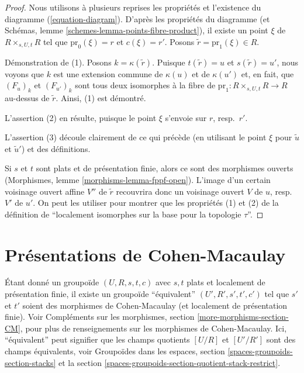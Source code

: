 \begin{proof}
Nous utilisons à plusieurs reprises les propriétés et l'existence du
diagramme (\ref{equation-diagram}).
D'après les propriétés du diagramme (et
Schémas, lemme \ref{schemes-lemma-points-fibre-product}),
il existe un point $\xi$ de $R \times_{s, U, t} R$
tel que $\text{pr}_0(\xi) = r$ et $c(\xi) = r'$.
Posons $\tilde r = \text{pr}_1(\xi) \in R$.

\medskip\noindent
Démonstration de (1). Posons $k = \kappa(\tilde r)$. Puisque $t(\tilde r) = u$
et $s(\tilde r) = u'$, nous voyons que $k$ est une extension commune
de $\kappa(u)$ et de $\kappa(u')$ et, en fait, que
$(F_u)_k$ et $(F_{u'})_k$ sont tous deux isomorphes à la fibre de
$\text{pr}_1 : R \times_{s, U, t} R \to R$ au-dessus de $\tilde r$.
Ainsi, (1) est démontré.

\medskip\noindent
L'assertion (2) en résulte, puisque le point $\xi$ s'envoie sur $r$, resp.\ $r'$.

\medskip\noindent
L'assertion (3) découle clairement de ce qui précède (en utilisant le point $\xi$ pour
$\tilde u$ et $\tilde u'$) et des définitions.

\medskip\noindent
Si $s$ et $t$ sont plats et de présentation finie, alors
ce sont des morphismes ouverts (Morphismes, lemme \ref{morphisms-lemma-fppf-open}).
L'image d'un certain voisinage ouvert affine $V''$ de $\tilde r$ recouvrira donc
un voisinage ouvert $V$ de $u$, resp.\ $V'$ de $u'$.
On peut les utiliser pour montrer que les propriétés (1) et (2) de la
définition de ``localement isomorphes sur la base pour la
topologie $\tau$''.
\end{proof}







\section{Présentations de Cohen-Macaulay}
\label{section-CM}

\noindent
Étant donné un groupoïde $(U, R, s, t, c)$ avec $s, t$ plats et
localement de présentation finie, il existe un groupoïde ``équivalent''
$(U', R', s', t', c')$ tel que $s'$ et $t'$ soient des morphismes
de Cohen-Macaulay (et localement de présentation finie). Voir
Compléments sur les morphismes, section \ref{more-morphisms-section-CM},
pour plus de renseignements sur les morphismes de Cohen-Macaulay.
Ici, ``équivalent'' peut signifier que les champs quotients
$[U/R]$ et $[U'/R']$ sont des champs équivalents, voir
Groupoïdes dans les espaces, section \ref{spaces-groupoids-section-stacks}
et la section \ref{spaces-groupoids-section-quotient-stack-restrict}.

